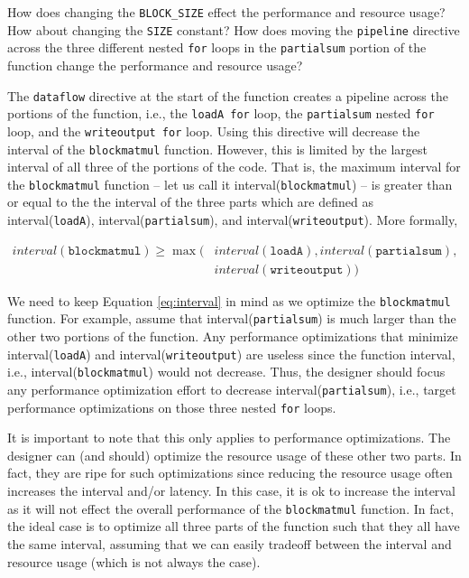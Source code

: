 \begin{exercise}
How does changing the \lstinline{BLOCK_SIZE} effect the performance and resource usage? How about changing the \lstinline{SIZE} constant? How does moving the \lstinline{pipeline} directive across the three different nested \lstinline{for} loops in the \lstinline{partialsum} portion of the function change the performance and resource usage?
\end{exercise}

The \lstinline{dataflow} directive at the start of the function creates a pipeline across the portions of the function, i.e., the \lstinline{loadA for} loop, the \lstinline{partialsum} nested \lstinline{for} loop, and the \lstinline{writeoutput for} loop. Using this directive will decrease the interval of the \lstinline{blockmatmul} function. However, this is limited by the largest interval of all three of the portions of the code. That is, the maximum interval for the \lstinline{blockmatmul} function -- let us call it interval(\lstinline{blockmatmul}) -- is greater than or equal to the the interval of the three parts which are defined as interval(\lstinline{loadA}), interval(\lstinline{partialsum}), and interval(\lstinline{writeoutput}). More formally, 
\begin{scriptsize}
\begin{align}
\label{eq:interval}
interval(\texttt{blockmatmul}) \ge \max(&interval(\texttt{loadA}), interval(\texttt{partialsum}), \nonumber \\
 & interval(\texttt{writeoutput}))
 \end{align}
 \end{scriptsize}

We need to keep Equation \ref{eq:interval} in mind as we optimize the \lstinline{blockmatmul} function. For example, assume that interval(\lstinline{partialsum}) is much larger than the other two portions of the function. Any performance optimizations that minimize interval(\lstinline{loadA}) and interval(\lstinline{writeoutput}) are useless since the function interval, i.e., interval(\lstinline{blockmatmul}) would not decrease. Thus, the designer should focus any performance optimization effort to decrease interval(\lstinline{partialsum}), i.e., target performance optimizations on those three nested \lstinline{for} loops. 

It is important to note that this only applies to performance optimizations. The designer can (and should) optimize the resource usage of these other two parts. In fact, they are ripe for such optimizations since reducing the resource usage often increases the interval and/or latency. In this case, it is ok to increase the interval as it will not effect the overall performance of the \lstinline{blockmatmul} function. In fact, the ideal case is to optimize all three parts of the function such that they all have the same interval, assuming that we can easily tradeoff between the interval and resource usage (which is not always the case). 

